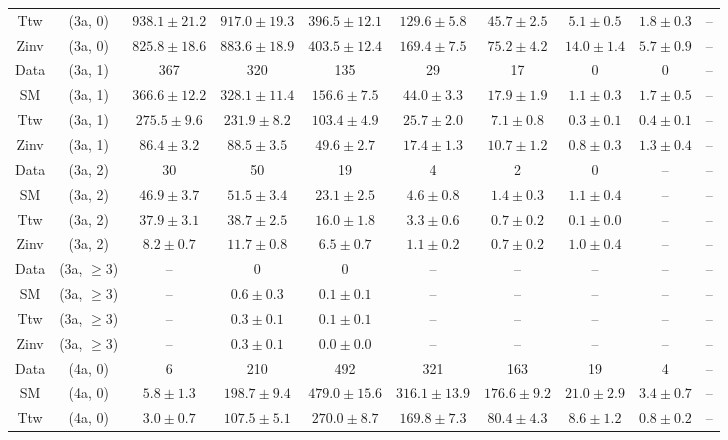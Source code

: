\begin{table}[h!]
{\begin{tabular}{cccccccccc}
	Ttw & (3a, 0) & $938.1\pm 21.2$ & $917.0\pm 19.3$ & $396.5\pm 12.1$ & $129.6\pm 5.8$ & $45.7\pm 2.5$ & $5.1\pm 0.5$ & $1.8\pm 0.3$ & -- \\[0.5ex] 
	Zinv & (3a, 0) & $825.8\pm 18.6$ & $883.6\pm 18.9$ & $403.5\pm 12.4$ & $169.4\pm 7.5$ & $75.2\pm 4.2$ & $14.0\pm 1.4$ & $5.7\pm 0.9$ & -- \\[0.5ex] 
	Data & (3a, 1) & 367 & 320 & 135 & 29 & 17 & 0 & 0 & -- \\[0.5ex] 
	SM & (3a, 1) & $366.6\pm 12.2$ & $328.1\pm 11.4$ & $156.6\pm 7.5$ & $44.0\pm 3.3$ & $17.9\pm 1.9$ & $1.1\pm 0.3$ & $1.7\pm 0.5$ & -- \\[0.5ex] 
	Ttw & (3a, 1) & $275.5\pm 9.6$ & $231.9\pm 8.2$ & $103.4\pm 4.9$ & $25.7\pm 2.0$ & $7.1\pm 0.8$ & $0.3\pm 0.1$ & $0.4\pm 0.1$ & -- \\[0.5ex] 
	Zinv & (3a, 1) & $86.4\pm 3.2$ & $88.5\pm 3.5$ & $49.6\pm 2.7$ & $17.4\pm 1.3$ & $10.7\pm 1.2$ & $0.8\pm 0.3$ & $1.3\pm 0.4$ & -- \\[0.5ex] 
	Data & (3a, 2) & 30 & 50 & 19 & 4 & 2 & 0 & -- & -- \\[0.5ex] 
	SM & (3a, 2) & $46.9\pm 3.7$ & $51.5\pm 3.4$ & $23.1\pm 2.5$ & $4.6\pm 0.8$ & $1.4\pm 0.3$ & $1.1\pm 0.4$ & -- & -- \\[0.5ex] 
	Ttw & (3a, 2) & $37.9\pm 3.1$ & $38.7\pm 2.5$ & $16.0\pm 1.8$ & $3.3\pm 0.6$ & $0.7\pm 0.2$ & $0.1\pm 0.0$ & -- & -- \\[0.5ex] 
	Zinv & (3a, 2) & $8.2\pm 0.7$ & $11.7\pm 0.8$ & $6.5\pm 0.7$ & $1.1\pm 0.2$ & $0.7\pm 0.2$ & $1.0\pm 0.4$ & -- & -- \\[0.5ex] 
	Data & (3a, $\ge3$) & -- & 0 & 0 & -- & -- & -- & -- & -- \\[0.5ex] 
	SM & (3a, $\ge3$) & -- & $0.6\pm 0.3$ & $0.1\pm 0.1$ & -- & -- & -- & -- & -- \\[0.5ex] 
	Ttw & (3a, $\ge3$) & -- & $0.3\pm 0.1$ & $0.1\pm 0.1$ & -- & -- & -- & -- & -- \\[0.5ex] 
	Zinv & (3a, $\ge3$) & -- & $0.3\pm 0.1$ & $0.0\pm 0.0$ & -- & -- & -- & -- & -- \\[0.5ex] 
	Data & (4a, 0) & 6 & 210 & 492 & 321 & 163 & 19 & 4 & -- \\[0.5ex] 
	SM & (4a, 0) & $5.8\pm 1.3$ & $198.7\pm 9.4$ & $479.0\pm 15.6$ & $316.1\pm 13.9$ & $176.6\pm 9.2$ & $21.0\pm 2.9$ & $3.4\pm 0.7$ & -- \\[0.5ex] 
	Ttw & (4a, 0) & $3.0\pm 0.7$ & $107.5\pm 5.1$ & $270.0\pm 8.7$ & $169.8\pm 7.3$ & $80.4\pm 4.3$ & $8.6\pm 1.2$ & $0.8\pm 0.2$ & -- \\[0.5ex] 

\end{tabular}}
\end{table}
